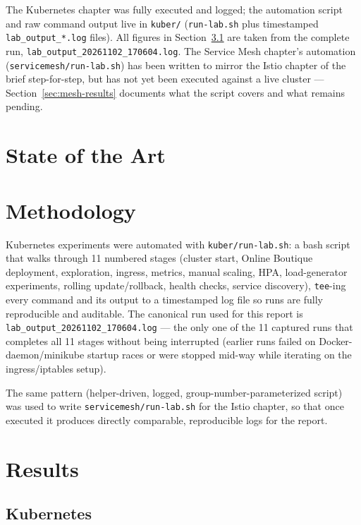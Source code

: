 \documentclass[a4paper,11pt]{article}
\begin{document}
The Kubernetes chapter was fully executed and logged; the automation script and raw command
output live in \texttt{kuber/} (\texttt{run-lab.sh} plus timestamped \texttt{lab\_output\_*.log}
files). All figures in Section~\ref{sec:k8s-results} are taken from the complete run,
\texttt{lab\_output\_20261102\_170604.log}. The Service Mesh chapter's automation
(\texttt{servicemesh/run-lab.sh}) has been written to mirror the Istio chapter of the brief
step-for-step, but has not yet been executed against a live cluster — Section~\ref{sec:mesh-results}
documents what the script covers and what remains pending.

\section{State of the Art}

\section{Methodology}

Kubernetes experiments were automated with \texttt{kuber/run-lab.sh}: a bash script that walks
through 11 numbered stages (cluster start, Online Boutique deployment, exploration, ingress,
metrics, manual scaling, HPA, load-generator experiments, rolling update/rollback, health checks,
service discovery), \texttt{tee}-ing every command and its output to a timestamped log file so
runs are fully reproducible and auditable. The canonical run used for this report is
\texttt{lab\_output\_20261102\_170604.log} — the only one of the 11 captured runs that completes
all 11 stages without being interrupted (earlier runs failed on Docker-daemon/minikube startup
races or were stopped mid-way while iterating on the ingress/iptables setup).

The same pattern (helper-driven, logged, group-number-parameterized script) was used to write
\texttt{servicemesh/run-lab.sh} for the Istio chapter, so that once executed it produces directly
comparable, reproducible logs for the report.

\section{Results}

\subsection{Kubernetes}
\label{sec:k8s-results}
\end{document}
